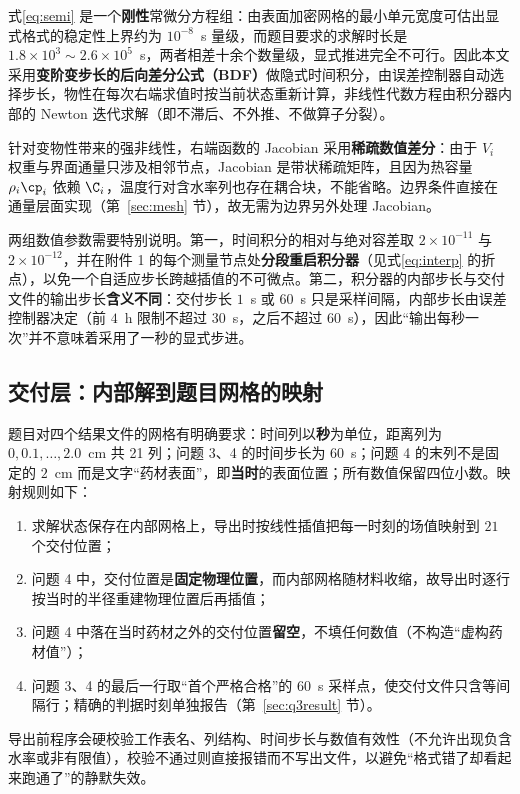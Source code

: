 式\eqref{eq:semi} 是一个\textbf{刚性}常微分方程组：由表面加密网格的最小单元宽度可估出显式格式的稳定性上界约为 $10^{-8}$~s 量级，而题目要求的求解时长是 $1.8\times10^3\sim2.6\times10^5$~s，两者相差十余个数量级，显式推进完全不可行。因此本文采用\textbf{变阶变步长的后向差分公式（BDF）}\cite{ascher1998,scipybdf2026}做隐式时间积分，由误差控制器自动选择步长，物性在每次右端求值时按当前状态重新计算，非线性代数方程由积分器内部的 Newton 迭代求解（即不滞后、不外推、不做算子分裂）。

针对变物性带来的强非线性，右端函数的 Jacobian 采用\textbf{稀疏数值差分}：由于 $V_i$ 权重与界面通量只涉及相邻节点，Jacobian 是带状稀疏矩阵，且因为热容量 $\rho_i{\cp}_i$ 依赖 ${\C}_i$，温度行对含水率列也存在耦合块，不能省略。边界条件直接在通量层面实现（第~\ref{sec:mesh} 节），故无需为边界另外处理 Jacobian。

两组数值参数需要特别说明。第一，时间积分的相对与绝对容差取 $2\times10^{-11}$ 与 $2\times10^{-12}$，并在附件 1 的每个测量节点处\textbf{分段重启积分器}（见式\eqref{eq:interp} 的折点），以免一个自适应步长跨越插值的不可微点。第二，积分器的内部步长与交付文件的输出步长\textbf{含义不同}：交付步长 $1$~s 或 $60$~s 只是采样间隔，内部步长由误差控制器决定（前 $4$~h 限制不超过 $30$~s，之后不超过 $60$~s），因此``输出每秒一次''并不意味着采用了一秒的显式步进。

\subsection{交付层：内部解到题目网格的映射}
\label{sec:delivery}

题目对四个结果文件的网格有明确要求：时间列以\textbf{秒}为单位，距离列为 $0,0.1,\ldots,2.0$~cm 共 21 列；问题 3、4 的时间步长为 $60$~s；问题 4 的末列不是固定的 $2$~cm 而是文字``药材表面''，即\textbf{当时}的表面位置；所有数值保留四位小数。映射规则如下：

\begin{enumerate}
  \item 求解状态保存在内部网格上，导出时按线性插值把每一时刻的场值映射到 $21$ 个交付位置；
  \item 问题 4 中，交付位置是\textbf{固定物理位置}，而内部网格随材料收缩，故导出时逐行按当时的半径重建物理位置后再插值；
  \item 问题 4 中落在当时药材之外的交付位置\textbf{留空}，不填任何数值（不构造``虚构药材值''）；
  \item 问题 3、4 的最后一行取``首个严格合格''的 $60$~s 采样点，使交付文件只含等间隔行；精确的判据时刻单独报告（第~\ref{sec:q3result} 节）。
\end{enumerate}

导出前程序会硬校验工作表名、列结构、时间步长与数值有效性（不允许出现负含水率或非有限值），校验不通过则直接报错而不写出文件，以避免``格式错了却看起来跑通了''的静默失效。
